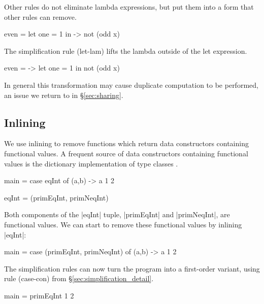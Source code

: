 \documentclass[preprint]{sigplanconf}
\begin{document}
\noindent Other rules do not eliminate lambda expressions, but put them into a form that other rules can remove.

\begin{example}
\begin{code}
even =  let  one = 1
        in   \x -> not (odd x)
\end{code}

\noindent The simplification rule (let-lam) lifts the lambda outside of the let expression.

\begin{code}
even = \x ->  let  one = 1
              in   not (odd x)
\end{code}

\noindent In general this transformation may cause duplicate computation to be performed, an issue we return to in \S\ref{sec:sharing}.
\end{example}


\subsection{Inlining}

We use inlining to remove functions which return data constructors containing functional values. A frequent source of data constructors containing functional values is the dictionary implementation of type classes \cite{wadler:type_classes}.

\begin{example}
\begin{code}
main = case  eqInt of
             (a,b) -> a 1 2

eqInt = (primEqInt, primNeqInt)
\end{code}

Both components of the |eqInt| tuple, |primEqInt| and |primNeqInt|, are functional values. We can start to remove these functional values by inlining |eqInt|:

\begin{code}
main = case  (primEqInt, primNeqInt) of
             (a,b) -> a 1 2
\end{code}

\noindent The simplification rules can now turn the program into a first-order variant, using rule (case-con) from \S\ref{sec:simplification_detail}.

\begin{code}
main = primEqInt 1 2
\end{code}\codeexample
\end{example}
\end{document}
